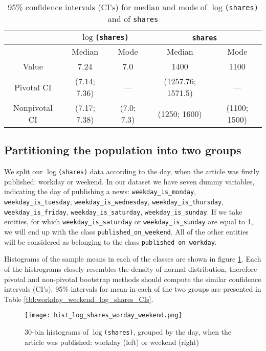 \begin{table}
\caption{95\% confidence intervals (CI's) for median and mode of \texttt{$\log$(shares)} and of \texttt{shares}} \label{tbl:log_shares_and_shares_median_mode_CIs}
\begin{center}
\begin{tabular}{|c|c|c||c|c|} 
 \hline
 & \multicolumn{2}{|c||}{\texttt{$\log$(shares)}} & \multicolumn{2}{|c|}{\texttt{shares}} \\ \hline 
& Median & Mode & Median & Mode  \\ \hline 
Value & 7.24 & 7.0 & 1400 & 1100 \\ \hline
Pivotal CI & (7.14; 7.36) & --- & (1257.76; 1571.5) & ---\\ \hline %
Nonpivotal CI & (7.17; 7.38) & (7.0; 7.3) & (1250; 1600) & (1100; 1500) \\ \hline
\end{tabular}
\end{center}
\end{table}  

\subsection*{Partitioning the population into two groups}
We split our \texttt{$\log$(shares)}  data according to the day, when the article was firstly published: workday or weekend. In our dataset we have seven dummy variables, indicating the day of publishing a news: \texttt{weekday\_is\_monday}, \texttt{weekday\_is\_tuesday}, \texttt{weekday\_is\_wed\-nes\-day}, \texttt{weekday\_is\_thursday}, \texttt{weekday\_is\_friday}, \texttt{weekday\_is\_saturday}, \texttt{weekday\_is\_sun\-day}. If we take entities, for which \texttt{weekday\_is\_saturday} or \texttt{weekday\_is\_sunday} are equal to 1, we will end up with the class \texttt{published\_on\_weekend}. All of the other entities will be considered as belonging to the class \texttt{published\_on\_workday}.  

Histograms of the sample means in each of the classes are shown in figure \ref{img:hist_log_shares_worday_weekend}. Each of the histrograms closely resembles the density of normal distribution, therefore pivotal and non-pivotal bootstrap methods should compute the similar confidence intervals (CI's). 95\% intervals for mean in each of the two groups are presented in Table \ref{tbl:workday_weekend_log_shares_CIs}.  

\begin{figure}[h!]
 \begin{center}
    \center \texttt{[image: hist\_log\_shares\_worday\_weekend.png]}
   \caption{30-bin histograms of \texttt{$\log$(shares)}, grouped by the day, when the article was published: workday (left) or weekend (right)}
   \label{img:hist_log_shares_worday_weekend}
 \end{center}
\end{figure} 

